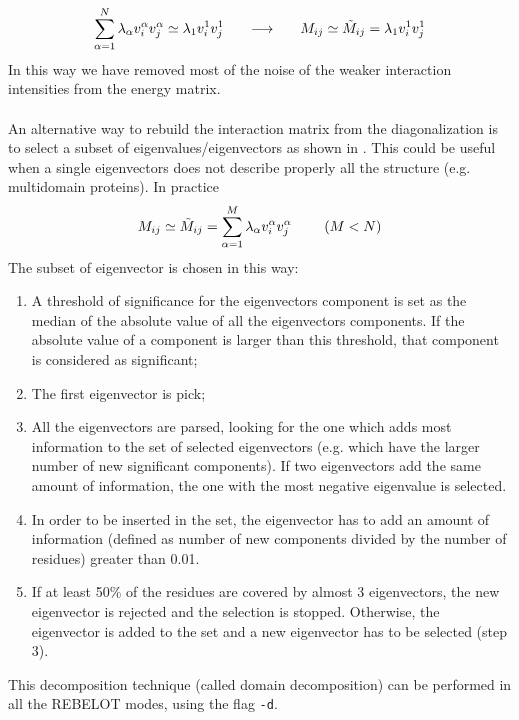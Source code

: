 \documentclass[a4paper,12pt]{book}
\begin{document}
\begin{equation}
\sum_{\alpha=1}^{N} \lambda_{\alpha} v_{i}^{\alpha} v_{j}^{\alpha}  \simeq  \lambda_{1} v_{i}^{1} v_{j}^{1} ~~~~~ \longrightarrow ~~~~~ M_{ij} \simeq \tilde{M}_{ij} = \lambda_{1} v_{i}^{1} v_{j}^{1}  \notag
\end{equation}
In this way we have removed most of the noise of the weaker interaction intensities from the energy matrix. \\ \\
An alternative way to rebuild the interaction matrix from the diagonalization is to select a subset of eigenvalues/eigenvectors as shown in \cite{genoni2012identification}. This could be useful when a single eigenvectors does not describe properly all the structure (e.g. multidomain proteins). In practice
\begin{equation}
M_{ij} \simeq \tilde{M}_{ij} = \sum_{\alpha=1}^{M} \lambda_{\alpha} v_{i}^{\alpha} v_{j}^{\alpha}~~~~~~~ (M<N) \notag
\end{equation}
The subset of eigenvector is chosen in this way:
\begin{enumerate}
	\item A threshold of significance for the eigenvectors component is set as the median of the absolute value of all the eigenvectors components. If the absolute value of a component is larger than this threshold, that component is considered as significant;
	\item The first eigenvector is pick;
	\item All the eigenvectors are parsed, looking for the one which adds most information to the set of selected eigenvectors (e.g. which have the larger number of new significant components). If two eigenvectors add the same amount of information, the one with the most negative eigenvalue is selected.
	\item In order to be inserted in the set, the eigenvector has to add an amount of information (defined as number of new components divided by the number of residues) greater than 0.01.
	\item If at least 50\% of the residues are covered by almost 3 eigenvectors, the new eigenvector is rejected and the selection is stopped. Otherwise, the eigenvector is added to the set and a new eigenvector has to be selected (step 3).
\end{enumerate}
This decomposition technique (called domain decomposition) can be performed in all the REBELOT modes, using the flag \texttt{-d}.
\end{document}
